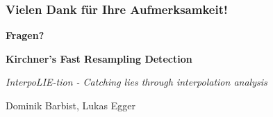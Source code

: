 \documentclass[11pt,t,usepdftitle=false,aspectratio=169]{beamer}
\begin{document}
\begin{frame}
	\frametitle{Vielen Dank für Ihre Aufmerksamkeit!}
	
	\vspace{2em}
	
	\begin{center}
		\Large{\textbf{Fragen?}}
		
		\vspace{1.5em}
		
		\textbf{Kirchner's Fast Resampling Detection}
		
		\textit{InterpoLIE-tion - Catching lies through interpolation analysis}
		
		\vspace{1.5em}
		
		\small{Dominik Barbist, Lukas Egger}
	\end{center}
\end{frame}
\end{document}
